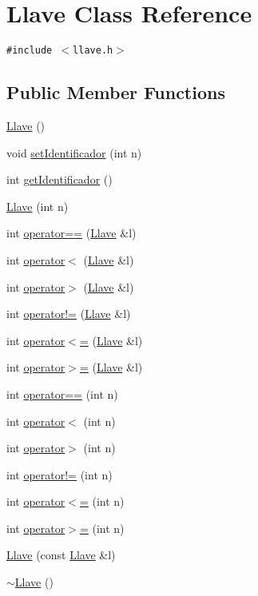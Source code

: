 \hypertarget{classLlave}{
\section{Llave Class Reference}
\label{classLlave}
}
{\tt \#include $<$llave.h$>$}

\subsection*{Public Member Functions}
\begin{CompactItemize}
\item 
\hyperlink{classLlave_a2f4f79518899176f8760ce8d0cc6c26}{Llave} ()
\item 
void \hyperlink{classLlave_c80fb30127165c307bc38873545e57fc}{setIdentificador} (int n)
\item 
int \hyperlink{classLlave_21a4a576a987126d469a6eecb167aed1}{getIdentificador} ()
\item 
\hyperlink{classLlave_b3bedc41ed2e5fedbc6d661d625c5cfb}{Llave} (int n)
\item 
int \hyperlink{classLlave_3ed579466201fc80172774d871ece003}{operator==} (\hyperlink{classLlave}{Llave} \&l)
\item 
int \hyperlink{classLlave_932475670e3d7c9e47ca0837d829a7eb}{operator$<$} (\hyperlink{classLlave}{Llave} \&l)
\item 
int \hyperlink{classLlave_be84640478b66d4114fc5995b7981dfb}{operator$>$} (\hyperlink{classLlave}{Llave} \&l)
\item 
int \hyperlink{classLlave_da6d6ec0cb9dc0c04b2b39d4a0dd9128}{operator!=} (\hyperlink{classLlave}{Llave} \&l)
\item 
int \hyperlink{classLlave_82d40399d2418c8e117f62f7df6ee95c}{operator$<$=} (\hyperlink{classLlave}{Llave} \&l)
\item 
int \hyperlink{classLlave_ad93df44517e7d51ceef30182afb8232}{operator$>$=} (\hyperlink{classLlave}{Llave} \&l)
\item 
int \hyperlink{classLlave_635d5c55c24d90520c5460973058b1ef}{operator==} (int n)
\item 
int \hyperlink{classLlave_a6d47e36c8bcd46f7153d00f7ca343d5}{operator$<$} (int n)
\item 
int \hyperlink{classLlave_c5abd96ecfa2d3e8827fce2710b1cbdd}{operator$>$} (int n)
\item 
int \hyperlink{classLlave_c4fdcbca296854f56c8ec7606c15ca40}{operator!=} (int n)
\item 
int \hyperlink{classLlave_6953a596b1bc6e951ef5ca434b5c1036}{operator$<$=} (int n)
\item 
int \hyperlink{classLlave_21d29952725fc8390d668e5ad2094110}{operator$>$=} (int n)
\item 
\hyperlink{classLlave_7db4b83fa86cc3974ac90c6c34c9c56e}{Llave} (const \hyperlink{classLlave}{Llave} \&l)
\item 
\hyperlink{classLlave_b0e13e4c7afa757571506ac3d04e5df2}{$\sim$Llave} ()
\end{CompactItemize}
